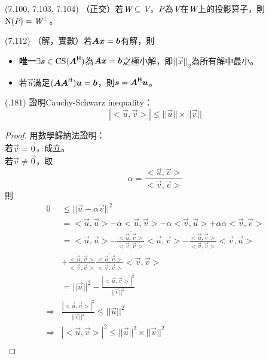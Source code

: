 \item \begin{theorem}{(7.100, 7.103, 7.104)} （正交）若$\spc{W} \subseteq \V$，$\P$為$\V$在$\spc{W}$上的投影算子，則$\Ker(\P) = \spc{W}^{\perp}$。
\end{theorem}

\item \begin{theorem}{(7.112)} （解，實數）若$\mat{A}\vec{x} = \vec{b}$有解，則
	\begin{itemize}
		\item \textbf{唯一}$\exists \vec{s} \in \cs(\mat{A}\herm)$為$\mat{A}\vec{x} = \vec{b}$之極小解，即$||\vec{x}||_2$為所有解中最小。
		\item 若$\vec{u}$滿足$(\mat{AA}\herm)\vec{u} = \vec{b}$，則$\vec{s} = \mat{A}\herm\vec{u}$。
	\end{itemize}
\end{theorem}

\item \begin{theorem}{(.181)} 證明Cauchy-Schwarz inequality：\begin{equation}
		|<\vec{u}, \vec{v}>| \le ||\vec{u}|| \times ||\vec{v}||
	\end{equation} \begin{proof}
		用數學歸納法證明： \\
		若$\vec{v} = \vec{0}$，成立。 \\
		若$\vec{v} \neq \vec{0}$，取\begin{equation}
			\alpha = \frac{<\vec{u}, \vec{v}>}{<\vec{v}, \vec{v}>}
		\end{equation} 則 \begin{equation}
			\begin{aligned}
				0 & \le ||\vec{u} - \alpha\vec{v}||^2 \\
				& = <\vec{u}, \vec{u}> - \overline{\alpha}<\vec{u}, \vec{v}> - \alpha<\vec{v}, \vec{u}> + \alpha\overline{\alpha}<\vec{v}, \vec{v}> \\
				& = <\vec{u}, \vec{u}> - \overline{\frac{<\vec{u}, \vec{v}>}{<\vec{v}, \vec{v}>}}<\vec{u}, \vec{v}> - \frac{<\vec{u}, \vec{v}>}{<\vec{v}, \vec{v}>}<\vec{v}, \vec{u}> \\
				& + \frac{<\vec{u}, \vec{v}>}{<\vec{v}, \vec{v}>}\overline{\frac{<\vec{u}, \vec{v}>}{<\vec{v}, \vec{v}>}}<\vec{v}, \vec{v}> \\
				& = ||\vec{u}||^2 - \frac{|<\vec{u}, \vec{v}>|^2}{||\vec{v}||^2} \\
				\Rightarrow & \frac{|<\vec{u}, \vec{v}>|^2}{||\vec{v}||^2} \le ||\vec{u}||^2 \\
				\Rightarrow & |<\vec{u}, \vec{v}>|^2 \le ||\vec{u}||^2 \times ||\vec{v}||^2 \\
			\end{aligned}
		\end{equation}
	\end{proof}
\end{theorem}
